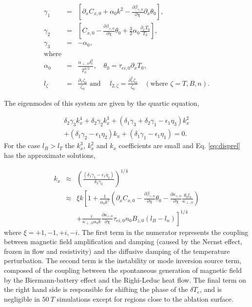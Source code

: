 \documentclass[aip,reprint]{revtex4-1}
\newcommand{\mypara}{{
		\par\vspace{\baselineskip}}}
\begin{document}
\begin{eqnarray}
\gamma_1 &=&\left[ \partial_x C_{x,0} + \alpha_0 k^2 - \frac{\partial \beta_{\wedge,0}}{\partial \chi}\partial_x \theta_0 \right],\nonumber\\
\gamma_2 &=&\left[ C_{x,0} -  \frac{\partial \beta_{\wedge,0}}{\partial \chi}  \theta_0 +\frac{3}{2}\alpha_0 \frac{\partial_x T_0}{T_0} \right ], \nonumber\\
\gamma_3 &=& -\alpha_0, \nonumber\\
\mbox{where} && \nonumber\\
\alpha_0 &=& \frac{\alpha_{\perp,0} \delta_c^2}{T_0^{3/2}}, \quad \theta_0 = \tau_{ei,0}\partial_x T_{0} , \nonumber\\
l_{\zeta} &=& \frac{\partial_x \zeta_0}{\zeta_0} \mbox{ and }\quad  l_{2,\zeta} = \frac{\partial_x^2 \zeta_0}{\zeta_0} \quad(\mbox{where } \zeta = T, B, n). \nonumber
\end{eqnarray}

The eigenmodes of this system are given by the quartic equation,

\begin{eqnarray}
\label{eq:disprel}
\delta_2 \gamma_3 k_x^4 + \delta_2 \gamma_2 k_x^3 + (\delta_1 \gamma_3 + \delta_2 \gamma_1 - \epsilon_1 \eta_3 ) k_x^2  \nonumber\\
 + (\delta_1 \gamma_2 - \epsilon_1 \eta_2) k_x + (\delta_1 \gamma_1 - \epsilon_1 \eta_1) = 0.
\end{eqnarray}
For the case $l_B > l_T$ the $k_x^3$, $k_x^2$ and $k_x$ coefficients are small and Eq. \ref{eq:disprel} has the approximate solutions,

\begin{eqnarray}
k_x &\approx& \left(\frac{(\delta_1 \gamma_1 - \epsilon_1 \eta_1)}{\delta_2 \gamma_3}\right)^{1/4} \nonumber\\
&\approx& \xi k \left[ 1 + \frac{1}{\alpha_0 k^2}\left(\partial_x C_{x,0} - \frac{\partial \beta_{\wedge,0}}{\partial \chi} \theta_0  -\frac{\partial \kappa_{\wedge,0}}{\partial \chi}  \frac{\theta_0 l_n}{ \kappa_{\perp,0}} \right)\right.  \nonumber\\
&  & \left. +\frac{i}{\kappa_{\perp,0}\alpha_{0} k}  \frac{\partial \kappa_{\wedge,0}}{\partial \chi} \tau_{ei,0} n_0 B_{z,0}\left( l_B - l_n \right) \right]^{1/4}
\label{eq:eigenvalues2}
\end{eqnarray}
where $\xi = +1, -1, +i, -i$. The first term in the numerator represents the coupling between magnetic field amplification and damping (caused by the  Nernst effect, frozen in flow and resistivity) and the diffusive damping of the temperature perturbation. The second term  is the instability or mode inversion source term, composed of the coupling between the spontaneous generation of magnetic field by the Biermann-battery effect and the Righi-Leduc heat flow. The final term on the right hand side is responsible for shifting the phase of the $\delta T_e$, and is negligible in $\SI{50}{T}$ simulations except for regions close to the ablation surface. 
\mypara
\end{document}
